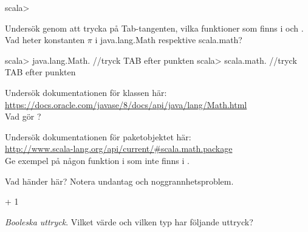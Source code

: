 {{{{{\begin{REPL}
scala>
\end{REPL}

\Subtask Undersök genom att trycka på Tab-tangenten, vilka funktioner som finns i  och . Vad heter konstanten $\pi$ i java.lang.Math respektive scala.math?

\begin{REPL}
scala> java.lang.Math.    //tryck TAB efter punkten
scala> scala.math.        //tryck TAB efter punkten
\end{REPL}

\Subtask Undersök dokumentationen för klassen  här: \\ \url{https://docs.oracle.com/javase/8/docs/api/java/lang/Math.html} \\
Vad gör ?

\Subtask Undersök dokumentationen för paketobjektet  här: \\
\url{http://www.scala-lang.org/api/current/#scala.math.package} \\
Ge exempel på någon funktion i  som inte finns i .


\Task Vad händer här? Notera undantag  och noggrannhetsproblem. %

\Subtask {} + 1

\Subtask {}

\Subtask {}

\Subtask {}

\Subtask {}

\Subtask {}

\Subtask {}

\Subtask {}

\Subtask {}

\Subtask {}


\Task \textit{Booleska uttryck}. Vilket värde och vilken typ har följande uttryck?  %

\Subtask {}

\Subtask {}

\Subtask {}

\Subtask {}

}}}}}
